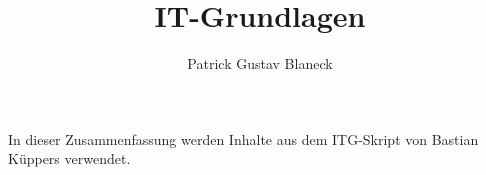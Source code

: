 \documentclass[german]{spicker}
\title{IT-Grundlagen}
\author{Patrick Gustav Blaneck}
\begin{document}
\maketitle
In dieser Zusammenfassung werden Inhalte aus dem ITG-Skript von Bastian Küppers verwendet.
\tableofcontents
\newpage








\printindex
\printindex[Beispiele]
\end{document}
